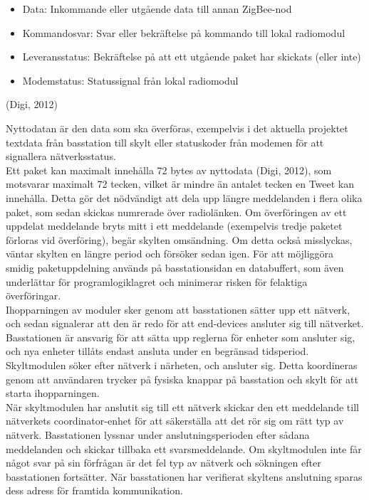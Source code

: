 \documentclass[a4paper,11pt]{article}
\begin{document}
	\begin{itemize}
    	\item Data: Inkommande eller utgående data till annan ZigBee-nod
    	\item Kommandosvar: Svar eller bekräftelse på kommando till lokal radiomodul
    	\item Leveransstatus: Bekräftelse på att ett utgående paket har skickats (eller inte)
    	\item Modemstatus: Statussignal från lokal radiomodul
    	\end{itemize}
(Digi, 2012)

Nyttodatan är den data som ska överföras, exempelvis i det aktuella projektet textdata från basstation till skylt eller statuskoder från modemen för att signallera nätverksstatus. \\

Ett paket kan maximalt innehålla 72 bytes av nyttodata (Digi, 2012), som motsvarar maximalt 72 tecken, vilket är mindre än antalet tecken en Tweet kan innehålla. Detta gör det nödvändigt att dela upp längre meddelanden i flera olika paket, som sedan skickas numrerade över radiolänken. Om överföringen av ett uppdelat meddelande bryts mitt i ett meddelande (exempelvis tredje paketet förloras vid överföring), begär skylten omsändning. Om detta också misslyckas, väntar skylten en längre period och försöker sedan igen. För att möjliggöra smidig paketuppdelning används på basstationsidan en databuffert, som även underlättar för programlogiklagret och minimerar risken för felaktiga överföringar. \\

Ihopparningen av moduler sker genom att basstationen sätter upp ett nätverk, och sedan signalerar att den är redo för att end-devices ansluter sig till nätverket. Basstationen är ansvarig för att sätta upp reglerna för enheter som ansluter sig, och nya enheter tillåts endast ansluta under en begränsad tidsperiod. Skyltmodulen söker efter nätverk i närheten, och ansluter sig. Detta koordineras genom att användaren trycker på fysiska knappar på basstation och skylt för att starta ihopparningen. \\

När skyltmodulen har anslutit sig till ett nätverk skickar den ett meddelande till nätverkets coordinator-enhet för att säkerställa att det rör sig om rätt typ av nätverk. Basstationen lyssnar under anslutningsperioden efter sådana meddelanden och skickar tillbaka ett svarsmeddelande. Om skyltmodulen inte får något svar på sin förfrågan är det fel typ av nätverk och sökningen efter basstationen fortsätter. När basstationen har verifierat skyltens anslutning sparas dess adress för framtida kommunikation. \\
\end{document}
